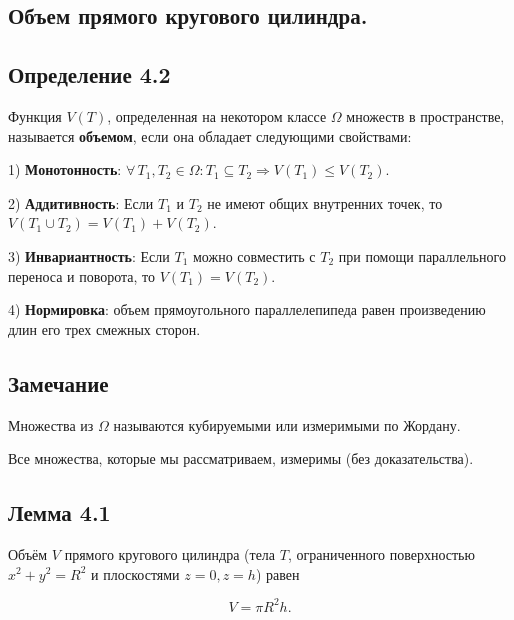 {
\subsection{Объем  прямого кругового цилиндра.}
\subsection*{Определение 4.2}

Функция \( V(T) \), определенная на некотором классе \( \Omega \) множеств в пространстве, называется \textbf{объемом}, если она обладает следующими свойствами:

1) \textbf{Монотонность}: \( \forall \, T_1, T_2 \in \Omega : T_1 \subseteq T_2 \Rightarrow V(T_1) \leq V(T_2) \).

2) \textbf{Аддитивность}: Если \( T_1 \) и \( T_2 \) не имеют общих внутренних точек, то \( V(T_1 \cup T_2) = V(T_1) + V(T_2) \).

3) \textbf{Инвариантность}: Если \( T_1 \) можно совместить с \( T_2 \) при помощи параллельного переноса и поворота, то \( V(T_1) = V(T_2) \).

4) \textbf{Нормировка}: объем прямоугольного параллелепипеда  равен произведению длин его трех смежных сторон.

\subsection*{Замечание}

Множества из \( \Omega \) называются кубируемыми или измеримыми по Жордану.

Все множества, которые мы рассматриваем, измеримы (без доказательства).

\subsection*{Лемма 4.1}

Объём \( V \) прямого кругового цилиндра (тела \( T \), ограниченного поверхностью \( x^2 + y^2 = R^2 \) и плоскостями \( z = 0, z = h \)) равен

\[
V = \pi R^2 h.
\]

}